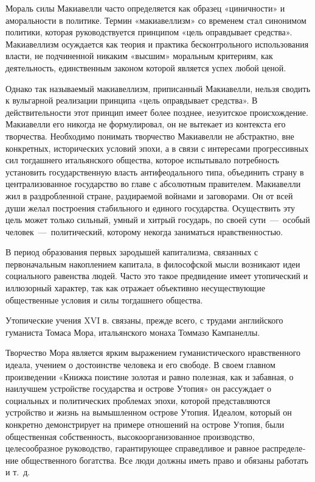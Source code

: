 \documentclass[14pt]{extarticle}
\begin{document}
Мораль силы Макиавелли часто определяется как образец «циничности» и аморальности в политике. Термин «макиавеллизм» со временем стал синонимом политики, которая руководствуется принципом «цель оправдывает средства». Макиавеллизм осуждается как теория и практика бесконтрольного использования власти, не подчиненной никаким «высшим» мораль­ным критериям, как деятельность, единственным за­коном которой является успех любой ценой.

Однако так называемый ма­киавеллизм, приписанный Макиавелли, нельзя сводить к вульгарной реализации принципа «цель оправдывает средства». В действительности этот принцип имеет более позднее, иезуитское происхождение. Макиавелли его никогда не формулировал, он не вытекает из кон­текста его творчества. Необходимо понимать творчество Макиавелли не абстрактно, вне конкретных, исторических условий эпохи, а в связи с интересами прогрессивных сил тогдашнего итальян­ского общества, которое испытывало потребность установить государ­ственную власть антифеодального типа, объединить страну в централизованное государство во главе с абсолютным правителем. Макиавелли жил в раздробленной стране, раздираемой войнами и заговорами. Он от всей души желал построения стабильного и единого государства. Осуществить эту цель может только сильный, умный и хитрый государь, по своей сути~---~особый человек~---~политический, которому некогда заниматься нравственностью.

В период образования первых зародышей капи­тализма, связанных с первоначальным накоплением капитала, в философской мысли возникают идеи со­циального равенства людей. Часто это такое предвидение имеет утопический и иллюзорный харак­тер, так как отражает объективно несуществующие общественные условия и силы тогдашнего общества.

Утопические учения XVI в. связаны, прежде всего, с трудами английского гуманиста Томаса Мора, итальянского монаха Томмазо Кампанеллы.

Творчество Мора является ярким выражением гуманистического нравственного идеала, учением о достоинстве человека и его свободе. В своем главном произведении «Книжка поистине золотая и равно полезная, как и забавная, о наилуч­шем устройстве государства и острове Утопия» он рассуждает о социальных и политических проблемах эпохи, которой представляются устройство и жизнь на вымышлен­ном острове Утопия. Идеалом, который он конкретно демонст­рирует на примере отношений на острове Утопия, были общественная собственность, высокоорганизованное производство, целесообразное руководство, гарантирующее справедливое и равное распределе­ние общественного богатства. Все люди должны иметь право и обязаны работать и т.~д.
\end{document}
